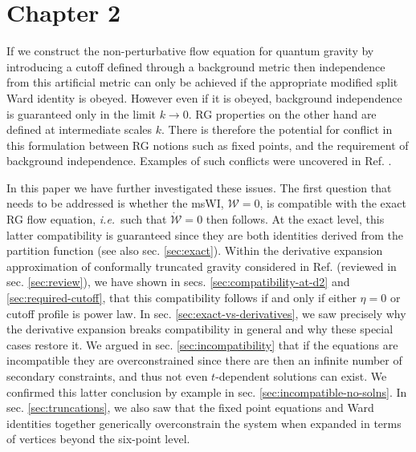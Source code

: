 \documentclass[11pt]{book}
\newcommand\ie{\textit{i.e.}\ }
\numberwithin{equation}{chapter}
\begin{document}
\section*{Chapter 2}

If we construct the non-perturbative flow equation for quantum gravity by introducing a cutoff defined through
a background metric then independence from this artificial metric can only be achieved if the appropriate
modified split Ward identity is obeyed. However even if it is obeyed, background independence is guaranteed
only in the limit $k\to0$.
RG properties on the other hand are defined at intermediate scales $k$.
There is therefore the potential for conflict in this formulation between RG notions such as fixed points,
and the requirement of background independence.
Examples of such conflicts were uncovered in Ref. \cite{Dietz:2015owa}.

In this paper we have further investigated these issues.
The first question that needs to be addressed is whether the msWI,
$\mathcal{W}=0$, is compatible with the exact RG flow equation, \ie such that $\dot{\mathcal{W}}=0$ then follows.
At the exact level, this latter compatibility is guaranteed since they are both identities derived from the
partition function (see also sec. \ref{sec:exact}).
Within the derivative expansion approximation of conformally truncated gravity considered in Ref.
\cite{Dietz:2015owa} (reviewed in sec. \ref{sec:review}),
we have shown  in secs. \ref{sec:compatibility-at-d2} and \ref{sec:required-cutoff},
that this compatibility follows if and only if either $\eta=0$ or cutoff profile is power law.
In sec. \ref{sec:exact-vs-derivatives}, we saw precisely why the derivative expansion breaks compatibility
in general and why these special cases restore it.
We argued in sec. \ref{sec:incompatibility} that if the equations are incompatible they are overconstrained
since there are then an infinite number of secondary constraints,
and thus not even $t$-dependent solutions can exist.
We confirmed this latter conclusion by example in sec. \ref{sec:incompatible-no-solns}.
In sec. \ref{sec:truncations},
we also saw that the fixed point equations and Ward identities together generically overconstrain the
system when expanded in terms of vertices beyond the six-point level.
\end{document}
